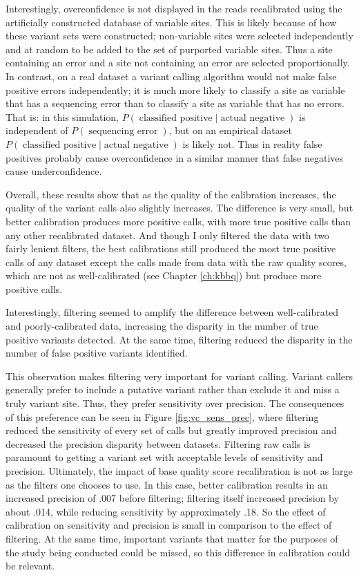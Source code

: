 Interestingly, overconfidence is not displayed in the reads recalibrated using the artificially constructed database of variable sites. This is likely because of how these variant sets were constructed; non-variable sites were selected independently and at random to be added to the set of purported variable sites. Thus a site containing an error and a site not containing an error are selected proportionally. In contrast, on a real dataset a variant calling algorithm would not make false positive errors independently; it is much more likely to classify a site as variable that has a sequencing error than to classify a site as variable that has no errors. That is: in this simulation, $P(\operatorname{classified\:positive} | \operatorname{actual\:negative})$ is independent of $P(\operatorname{sequencing\:error})$, but on an empirical dataset $P(\operatorname{classified\:positive} | \operatorname{actual\:negative})$ is likely not. Thus in reality false positives probably cause overconfidence in a similar manner that false negatives cause underconfidence.

Overall, these results show that as the quality of the calibration increases, the quality of the variant calls also slightly increases. The difference is very small, but better calibration produces more positive calls, with more true positive calls than any other recalibrated dataset. And though I only filtered the data with two fairly lenient filters, the best calibrations still produced the most true positive calls of any dataset except the calls made from data with the raw quality scores, which are not as well-calibrated (see Chapter \ref{ch:kbbq}) but produce more positive calls.

Interestingly, filtering seemed to amplify the difference between well-calibrated and poorly-calibrated data, increasing the disparity in the number of true positive variants detected. At the same time, filtering reduced the disparity in the number of false positive variants identified.

This observation makes filtering very important for variant calling. Variant callers generally prefer to include a putative variant rather than exclude it and miss a truly variant site. Thus, they prefer sensitivity over precision. The consequences of this preference can be seen in Figure \ref{fig:vc_sens_prec}, where filtering reduced the sensitivity of every set of calls but greatly improved precision and decreased the precision disparity between datasets. Filtering raw calls is paramount to getting a variant set with acceptable levels of sensitivity and precision. Ultimately, the impact of base quality score recalibration is not as large as the filters one chooses to use. In this case, better calibration results in an increased precision of .007 before filtering; filtering itself increased precision by about .014, while reducing sensitivity by approximately .18. So the effect of calibration on sensitivity and precision is small in comparison to the effect of filtering. At the same time, important variants that matter for the purposes of the study being conducted could be missed, so this difference in calibration could be relevant.

